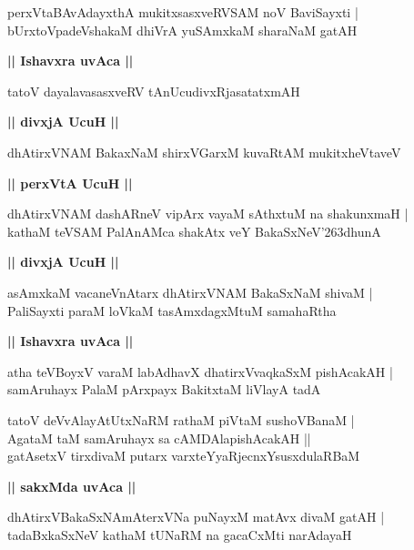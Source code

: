 \documentclass[twoside,12pt,openright]{book}
\def\S{\char'263}
\newcounter{shloka}[chapter]
\def\uvaca#1{\centerline{{\large\textbf{#1}}}}
\begin{document}
\begin{shloka}%
perxVtaBAvAdayxthA mukitxsasxveRVSAM noV BaviSayxti |\\
bUrxtoVpadeVshakaM dhiVrA yuSAmxkaM sharaNaM gatAH 
\end{shloka}

\uvaca{|| Ishavxra uvAca ||}

\begin{shloka}%
tatoV dayalavasasxveRV tAnUcudivxRjasatatxmAH 
\end{shloka}

\uvaca{|| divxjA UcuH ||}

\begin{shloka}%
dhAtirxVNAM BakaxNaM shirxVGarxM kuvaRtAM mukitxheVtaveV 
\end{shloka}

\uvaca{|| perxVtA UcuH ||}

\begin{shloka}%
dhAtirxVNAM dashARneV vipArx vayaM sAthxtuM na shakunxmaH |\\
kathaM teVSAM PalAnAMca shakAtx veY BakaSxNeV\S dhunA
\end{shloka}

\uvaca{|| divxjA UcuH ||}

\begin{shloka}%
asAmxkaM vacaneVnAtarx dhAtirxVNAM BakaSxNaM shivaM |\\
PaliSayxti paraM loVkaM tasAmxdagxMtuM samahaRtha
\end{shloka}

\uvaca{|| Ishavxra uvAca ||}

\begin{shloka}%
atha teVBoyxV varaM labAdhavX dhatirxVvaqkaSxM pishAcakAH |\\
samAruhayx PalaM pArxpayx BakitxtaM liVlayA tadA 
\end{shloka}

\begin{shloka}%
tatoV deVvAlayAtUtxNaRM rathaM piVtaM sushoVBanaM |\\
AgataM taM samAruhayx sa cAMDAlapishAcakAH ||\\
gatAsetxV tirxdivaM putarx varxteYyaRjecnxYsusxdulaRBaM 
\end{shloka}

\uvaca{|| sakxMda uvAca ||}

\begin{shloka}%
dhAtirxVBakaSxNAmAterxVNa puNayxM matAvx divaM gatAH |\\
tadaBxkaSxNeV kathaM tUNaRM na gacaCxMti narAdayaH 
\end{shloka}
\end{document}

